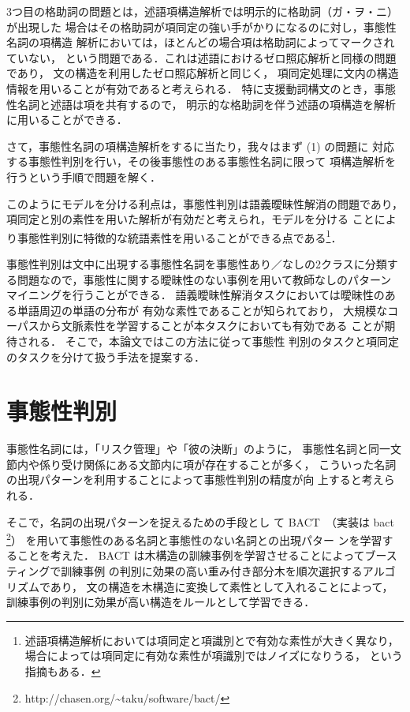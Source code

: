 \documentclass[japanese]{jnlp_1.4}
\begin{document}
3つ目の格助詞の問題とは，述語項構造解析では明示的に格助詞（ガ・ヲ・ニ）が出現した
場合はその格助詞が項同定の強い手がかりになるのに対し，事態性名詞の項構造
解析においては，ほとんどの場合項は格助詞によってマークされていない，
という問題である．これは述語におけるゼロ照応解析と同様の問題であり，
文の構造を利用したゼロ照応解析\cite{iida:2006:ACL}と同じく，
項同定処理に文内の構造情報を用いることが有効であると考えられる．
特に支援動詞構文のとき，事態性名詞と述語は項を共有するので，
明示的な格助詞を伴う述語の項構造を解析に用いることができる．

さて，事態性名詞の項構造解析をするに当たり，我々はまず (1) の問題に
対応する事態性判別を行い，その後事態性のある事態性名詞に限って
項構造解析を行うという手順で問題を解く．

このようにモデルを分ける利点は，事態性判別は語義曖昧性解消の問題であり，
項同定と別の素性を用いた解析が有効だと考えられ，モデルを分ける
ことにより事態性判別に特徴的な統語素性を用いることができる点である\footnote{
	述語項構造解析においては項同定と項識別とで有効な素性が大きく異なり，
	場合によっては項同定に有効な素性が項識別ではノイズになりうる，
	という指摘\cite{pradhan:2005:ML}もある．}．

事態性判別は文中に出現する事態性名詞を事態性あり／なしの2クラスに分類す
る問題なので，事態性に関する曖昧性のない事例を用いて教師なしのパターン
マイニングを行うことができる．
語義曖昧性解消タスクにおいては曖昧性のある単語周辺の単語の分布が
有効な素性であることが知られており，
大規模なコーパスから文脈素性を学習することが本タスクにおいても有効である
ことが期待される．
そこで，本論文ではこの方法に従って事態性
判別のタスクと項同定のタスクを分けて扱う手法を提案する．



\section{事態性判別}
\label{sec:eventhood}

事態性名詞には，「リスク管理」や「彼の決断」のように，
事態性名詞と同一文節内や係り受け関係にある文節内に項が存在することが多く，
こういった名詞の出現パターンを利用することによって事態性判別の精度が向
上すると考えられる．

そこで，名詞の出現パターンを捉えるための手段とし
て BACT~\cite{kudo:2004:EMNLP}（実装は bact
\footnote{http://chasen.org/\~{}taku/software/bact/}）
を用いて事態性のある名詞と事態性のない名詞との出現パター
ンを学習することを考えた．
BACT は木構造の訓練事例を学習させることによってブースティングで訓練事例
の判別に効果の高い重み付き部分木を順次選択するアルゴリズムであり，
文の構造を木構造に変換して素性として入れることによって，
訓練事例の判別に効果が高い構造をルールとして学習できる．
\end{document}

